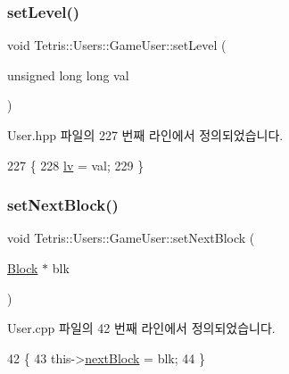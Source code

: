 \subsubsection{\texorpdfstring{set\+Level()}{setLevel()}}
{\footnotesize\ttfamily void Tetris\+::\+Users\+::\+Game\+User\+::set\+Level (\begin{DoxyParamCaption}\item[{unsigned long long}]{val }\end{DoxyParamCaption})\hspace{0.3cm}{\ttfamily [inline]}}



User.\+hpp 파일의 227 번째 라인에서 정의되었습니다.


\begin{DoxyCode}
227                                                  \{
228                 \hyperlink{class_tetris_1_1_users_1_1_game_user_a11a2856fee30a69a19550b42c041a312}{lv} = val;
229             \}
\end{DoxyCode}
\mbox{\label{class_tetris_1_1_users_1_1_game_user_a6249d0f4e9d77edd94935a74bbd298d5}} 
\subsubsection{\texorpdfstring{set\+Next\+Block()}{setNextBlock()}\hspace{0.1cm}{\footnotesize\ttfamily [1/2]}}
{\footnotesize\ttfamily void Tetris\+::\+Users\+::\+Game\+User\+::set\+Next\+Block (\begin{DoxyParamCaption}\item[{\hyperlink{class_tetris_1_1_block}{Block} $\ast$}]{blk }\end{DoxyParamCaption})}



User.\+cpp 파일의 42 번째 라인에서 정의되었습니다.


\begin{DoxyCode}
42                                                      \{
43                     this->\hyperlink{class_tetris_1_1_users_1_1_game_user_a49be97be588cd4b6438f06ec693787d5}{nextBlock} = blk;
44                 \}
\end{DoxyCode}
\mbox{\label{class_tetris_1_1_users_1_1_game_user_a6249d0f4e9d77edd94935a74bbd298d5}} 
